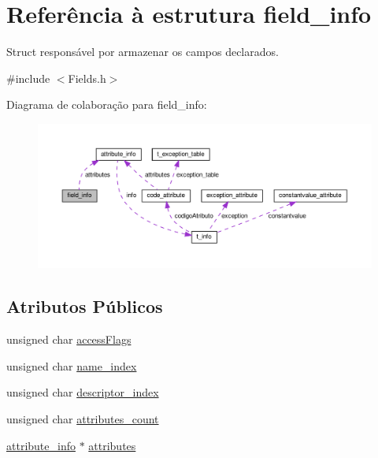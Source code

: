 \hypertarget{structfield__info}{}\section{Referência à estrutura field\+\_\+info}
\label{structfield__info}


Struct responsável por armazenar os campos declarados.  




{\ttfamily \#include $<$Fields.\+h$>$}



Diagrama de colaboração para field\+\_\+info\+:
\nopagebreak
\begin{figure}[H]
\begin{center}
\leavevmode
\includegraphics[width=350pt]{structfield__info__coll__graph}
\end{center}
\end{figure}
\subsection*{Atributos Públicos}
\begin{DoxyCompactItemize}
\item 
unsigned char \hyperlink{structfield__info_a52647ac149308d5ef9f010689400ee4c}{access\+Flags}
\item 
unsigned char \hyperlink{structfield__info_abb3389c726c0efe891c2d26567ecea49}{name\+\_\+index}
\item 
unsigned char \hyperlink{structfield__info_afe39e4e9e594dfce15635923ad7d1f06}{descriptor\+\_\+index}
\item 
unsigned char \hyperlink{structfield__info_a89ea1703d384244c336899c3b04850f9}{attributes\+\_\+count}
\item 
\hyperlink{structattribute__info}{attribute\+\_\+info} $\ast$ \hyperlink{structfield__info_afdda114944ae5eaae78c237f99257108}{attributes}
\end{DoxyCompactItemize}


